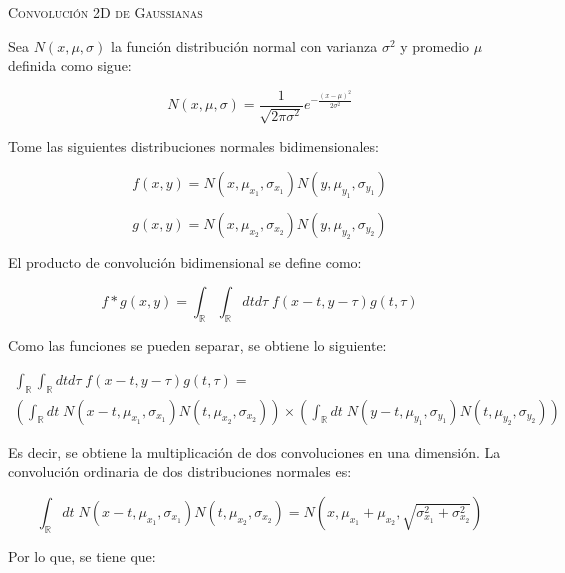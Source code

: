 \documentclass[oneside]{book}
\begin{document}
\begin{center}
\textsc{\LARGE Convolución 2D de Gaussianas}\\[0.5cm]
\end{center}

Sea $N(x,\mu,\sigma)$ la función distribución normal con varianza $\sigma^2$ y promedio $\mu$ definida como sigue:

\begin{equation}
N(x,\mu,\sigma) = \frac{1}{\sqrt{2\pi \sigma^2}}e^{- \frac{(x-\mu)^2}{2\sigma^2}}
\end{equation}

Tome las siguientes distribuciones normales bidimensionales:

\begin{equation}
f(x,y) =  N(x,\mu_{x_1},\sigma_{x_1}) N(y,\mu_{y_1},\sigma_{y_1})
\end{equation}

\begin{equation}
g(x,y) =  N(x,\mu_{x_2},\sigma_{x_2}) N(y,\mu_{y_2},\sigma_{y_2})
\end{equation}


El producto de convolución bidimensional se define como:

\begin{equation}
f*g(x,y)  = \int_{\mathbb{R}} \int_{\mathbb{R}} dt d\tau\;  f(x-t,y-\tau) g(t,\tau)
\end{equation}

Como las funciones se pueden separar, se obtiene lo siguiente:

\begin{multline}
\int_{\mathbb{R}} \int_{\mathbb{R}} dt d\tau\;  f(x-t,y-\tau) g(t,\tau)  =\\ \left( \int_{\mathbb{R}} dt\;   N(x-t,\mu_{x_1},\sigma_{x_1})  N(t,\mu_{x_2},\sigma_{x_2})  \right) \times \left( \int_{\mathbb{R}} dt\;   N(y-t,\mu_{y_1},\sigma_{y_1})  N(t,\mu_{y_2},\sigma_{y_2})  \right) 
\end{multline}

Es decir, se obtiene la multiplicación de dos convoluciones en una dimensión. La convolución ordinaria de dos distribuciones normales es:

\begin{equation}
\int_{\mathbb{R}} dt\;   N(x-t,\mu_{x_1},\sigma_{x_1})  N(t,\mu_{x_2},\sigma_{x_2})  =   N\left(x, \mu_{x_1} +\mu_{x_2}, \sqrt{\sigma_{x_1}^2 + \sigma_{x_2}^2}\right)
\end{equation}

Por lo que, se tiene que:
\end{document}
